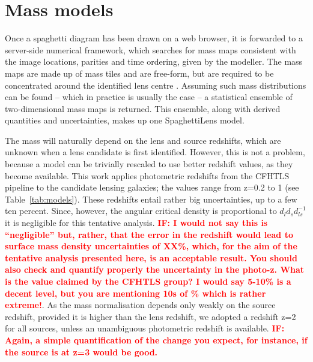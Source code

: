 
\section{Mass models}\label{sec:massmodels}

Once a spaghetti diagram has been drawn on a web browser, it is
forwarded to a server-side numerical framework, which searches for
mass maps consistent with the image locations, parities and time
ordering, given by the modeller.  The mass maps are made up of mass
tiles and are free-form, but are required to be concentrated around
the identified lens centre \citep[see][for the precise formulation of
  the search problem]{2014MNRAS.445.2181C}. Assuming such mass
distributions can be found -- which in practice is usually the case --
a statistical ensemble of two-dimensional mass maps is returned.  This
ensemble, along with derived quantities and uncertainties, makes up
one SpaghettiLens model.

The mass will naturally depend on the lens and source redshifts, which
are unknown when a lens candidate is first identified.  However, this
is not a problem, because a model can be trivially rescaled to use
better redshift values, as they become available.  This work applies
photometric redshifts from the CFHTLS pipeline
\citep{2009A&A...500..981C} to the candidate lensing galaxies; the
values range from z=0.2 to 1 (see Table~\ref{tab:models}).
These redshifts entail rather big uncertainties, up to a few ten
percent.  Since, however, the angular critical density is proportional
to $d_l d_s d_{ls}^{-1}$ \citep[consult Equation~A1
  in][]{2015MNRAS.447.2170K} it is negligible for this tentative
analysis. \textcolor{red}{\bf IF: I would not say this is
  ``negligible'' but, rather, that the error in the redshift would lead to
  surface mass density uncertainties of XX\%, which, for the
  aim of the tentative analysis presented here, is an acceptable
  result. You should also check and quantify properly the
  uncertainty in the photo-z. What is the value claimed by the
  CFHTLS group? I would say 5-10\% is a decent level, but you
are mentioning 10s of \% which is rather extreme!}.
As the mass normalisation depends only weakly on the source redshift,
provided it is higher than the lens redshift, we adopted a redshift
z=2 for all sources, unless an unambiguous photometric redshift is
available. \textcolor{red}{\bf IF: Again, a simple quantification of the
change you expect, for instance, if the source is at z=3 would be good.}

